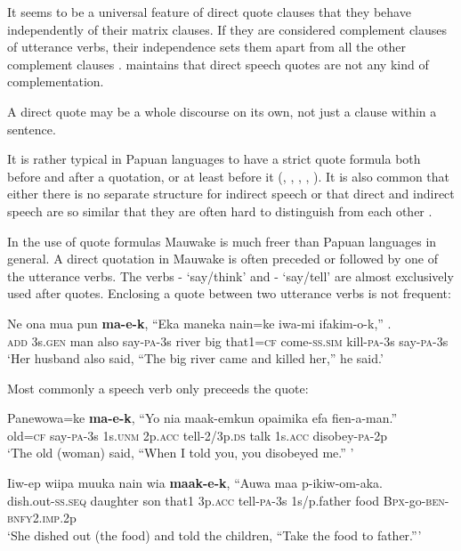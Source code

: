 It seems to be a universal feature of direct quote clauses that they behave independently of their matrix clauses. If they are considered complement clauses of utterance verbs, their independence sets them apart from all the other complement clauses \citep[303]{Munro1982}. \citet[398]{Dixon2010} maintains that direct speech quotes are not any kind of complementation.

A direct quote may be a whole discourse on its own, not just a clause within a sentence.

It is rather typical in Papuan languages to have a strict quote formula both before and after a quotation, or at least before it (\citealt[120]{Franklin1971}, \citealt[1]{Davies1981}, \citealt[12]{Roberts1987}, \citealt{Farr1999}, \citealt[128]{Hepner2002}). It is also common that either there is no separate structure for indirect speech \citep[2]{Davies1981} or that direct and indirect speech are so similar that they are often hard to distinguish from each other \citep[14]{Roberts1987}. 

In the use of quote formulas Mauwake is much freer than Papuan languages in general. A direct quotation in Mauwake is often preceded or followed by one of the utterance verbs. The verbs - `say/think' and - `say/tell' are almost exclusively used after quotes. Enclosing a quote between two utterance verbs is not frequent:

\ea%
\label{ex:8:x1571}
\gll Ne  ona  mua  pun  \textbf{ma-e-k},  ``Eka  maneka  nain=ke iwa-mi  ifakim-o-k,''  .\\
\textsc{add} 3s.\textsc{gen} man  also  say-\textsc{pa}-3s river big  that1=\textsc{cf} come-\textsc{ss}.\textsc{sim} kill-\textsc{pa}-3s  say-\textsc{pa}-3s\\
\glt`Her husband also said, ``The big river came and killed her,'' he said.'
\z


Most commonly a speech verb only preceeds the quote:

\ea%
\label{ex:8:x1578}
\gll Panewowa=ke  \textbf{ma-e-k},  ``Yo  nia  maak-emkun  opaimika efa  fien-a-man.''\\
old=\textsc{cf} say-\textsc{pa}-3s 1s.\textsc{unm} 2p.\textsc{acc} tell-2/3p.\textsc{ds} talk 1s.\textsc{acc} disobey-\textsc{pa}-2p\\
\glt`The old (woman) said, ``When I told you, you disobeyed me.'' '
\z


\ea%
\label{ex:8:x1579}
\gll Iiw-ep  wiipa  muuka  nain  wia  \textbf{maak-e-k}, ``Auwa  maa  p-ikiw-om-aka.\\
dish.out-\textsc{ss}.\textsc{seq} daughter  son  that1 3p.\textsc{acc} tell-\textsc{pa}-3s 1s/p.father food \textsc{Bpx}-go-\textsc{ben}-\textsc{bnfy}2.\textsc{imp}.2p\\
\glt`She dished out (the food) and told the children, ``Take the food to father.''{}'
\z


